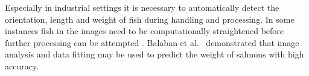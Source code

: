 \documentclass[conference]{IEEEtran}
\begin{document}
Especially in industrial settings it is necessary to automatically
detect the orientation, length and weight of fish during handling
and processing.
In some instances fish in the images need to be computationally straightened
before further processing can be attempted \cite{MuozBenavent2018EnhancedFB}.
Balaban et al.~\cite{Balaban2010UsingIA} demonstrated that image analysis
and data fitting may be used to predict the weight of salmons with high
accuracy.
\end{document}

